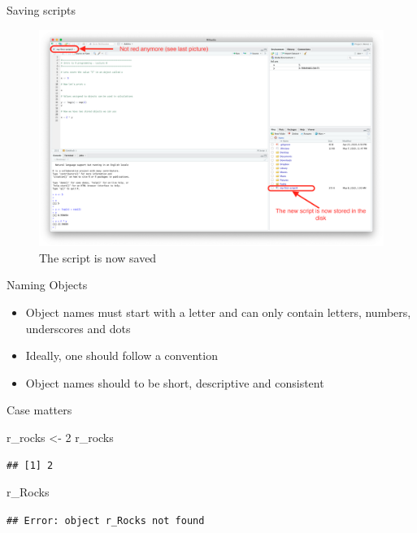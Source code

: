 \documentclass[ignorenonframetext,]{beamer}
\newenvironment{Shaded}{\begin{snugshade}}{\end{snugshade}}
\newcommand{\DecValTok}[1]{\textcolor[rgb]{0.00,0.00,0.81}{#1}}
\newcommand{\NormalTok}[1]{#1}
\newcommand{\StringTok}[1]{\textcolor[rgb]{0.31,0.60,0.02}{#1}}
\begin{document}
\begin{frame}{Saving scripts}
\protect\hypertarget{saving-scripts-1}{}

\begin{figure}
\includegraphics[scale=0.18]{figures/saved}
\caption{The script is now saved}
\end{figure}

\end{frame}

\begin{frame}{Naming Objects}
\protect\hypertarget{naming-objects}{}

\begin{itemize}
\item
  Object names must start with a letter and can only contain letters,
  numbers, underscores and dots
\item
  Ideally, one should follow a convention
\item
  Object names should to be short, descriptive and consistent
\end{itemize}

\end{frame}

\begin{frame}[fragile]{Case matters}
\protect\hypertarget{case-matters}{}

\begin{Shaded}
\begin{Highlighting}[]
\NormalTok{r_rocks <-}\StringTok{ }\DecValTok{2} 
\NormalTok{r_rocks}
\end{Highlighting}
\end{Shaded}

\begin{verbatim}
## [1] 2
\end{verbatim}

\begin{Shaded}
\begin{Highlighting}[]
\NormalTok{r_Rocks}
\end{Highlighting}
\end{Shaded}

\texttt{\#\#\ Error:\ object\ \textquotesingle{}r\_Rocks\textquotesingle{}\ not\ found}

\end{frame}
\end{document}
